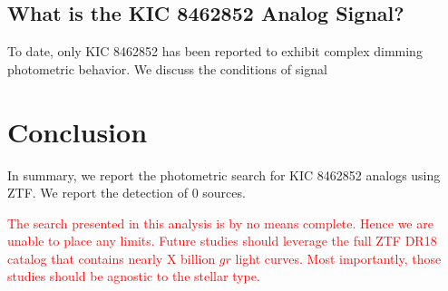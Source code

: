 \documentclass[linenumbers]{aastex631}
\begin{document}
\subsection{What is the KIC 8462852 Analog Signal?}
To date, only KIC 8462852 has been reported to exhibit complex dimming photometric behavior. We discuss the conditions of signal 


\section{Conclusion} \label{sec:conclusion}
In summary, we report the photometric search for KIC 8462852 analogs using ZTF. We report the detection of 0 sources.

\textcolor{red}{The search presented in this analysis is by no means complete. Hence we are unable to place any limits. Future studies should leverage the full ZTF DR18 catalog that contains nearly X billion $gr$ light curves. Most importantly, those studies should be agnostic to the stellar type.}


{}

\end{document}
